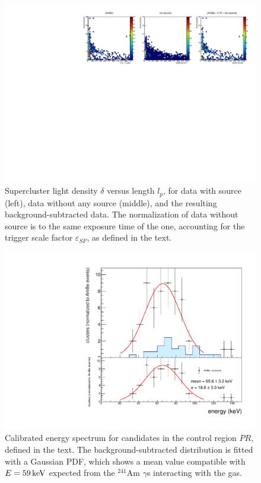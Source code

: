 \begin{figure}[ht]
  \begin{center}
  \includegraphics[width=0.90\linewidth]{figures/densityvslength_zoom}

  \caption{Supercluster light density $\delta$ versus length $l_p$,
    for data with \ambe source (left), data without any source
    (middle), and the resulting background-subtracted \ambe data.  The
    normalization of data without source is to the same exposure time
    of the \ambe one, accounting for the trigger scale factor
    $\varepsilon_{SF}$, as defined in the text. \label{fig:dvsl}}

  \end{center}
\end{figure}

\begin{figure}[ht]
  \begin{center}
  \includegraphics[width=0.60\linewidth]{figures/calintegral_59keV}

  \caption{Calibrated energy spectrum for candidates in the control
    region $PR$, defined in the text. The background-subtracted
    distribution is fitted with a Gaussian PDF, which shows a mean
    value compatible with $E=59\,\textrm{ke\hspace{-.08em}V}$ expected from the $^{241}$Am
    $\gamma$s interacting with the gas. \label{fig:59keV}}

  \end{center}
\end{figure}

